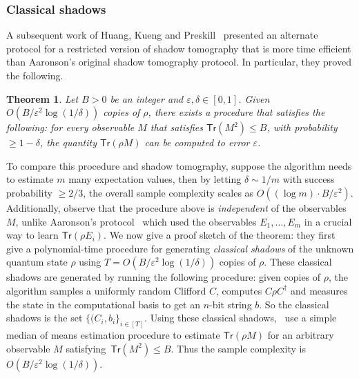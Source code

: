 \documentclass[11pt]{article}
\newcommand{\Tr}{\textsf{Tr}}
\newtheorem{theorem}{Theorem}
\begin{document}
\subsubsection{Classical shadows} 
A subsequent work of Huang, Kueng and Preskill~\cite{huangpreskill} presented an alternate protocol for a restricted version of shadow tomography that is more time efficient than Aaronson's original shadow tomography protocol. In particular, they proved the following.
\begin{theorem}
Let $B>0$ be an integer and $\varepsilon,\delta \in [0,1]$. Given $O(B/\varepsilon^2 \log(1/\delta))$ copies of $\rho$,  there exists a procedure that satisfies the following: for every observable $M$  that satisfies  $\Tr(M^2)\leq B$, with probability $\geq 1-\delta$, the quantity $\Tr(\rho M)$ can be computed to error $\varepsilon$.
\end{theorem}
To compare this procedure and shadow tomography, suppose the algorithm needs to estimate $m$ many expectation values, then by letting $\delta\sim 1/m$ with success probability $\geq 2/3$, the overall sample complexity scales as $O((\log m) \cdot B/\varepsilon^2)$. Additionally, observe that the procedure above is \emph{independent} of the observables $M$, unlike Aaronson's protocol~\cite{aaronson:shadow} which used the observables $E_1,\ldots, E_m$ in a crucial way to learn $\Tr(\rho E_i)$. We now give a proof sketch of the theorem: they first give a  polynomial-time procedure for generating \emph{classical shadows} of the unknown quantum state $\rho$ using $T=O(B/\varepsilon^2 \log(1/\delta))$ copies of $\rho$. These classical shadows are generated by running the following procedure: given copies of $\rho$, the algorithm samples a uniformly random Clifford $C$, computes $C\rho C^\dagger$ and measures the state in the computational basis to get an $n$-bit string $b$. So the classical shadows is the set $\{(C_i,b_i\}_{i\in [T]}$. Using these classical shadows,~\cite{huangpreskill} use a simple median of means estimation procedure to estimate $\Tr(\rho M)$ for an arbitrary observable $M$ satisfying~$\Tr(M^2)\leq B$. Thus the sample complexity is $O(B/\varepsilon^2\log(1/\delta))$.
\end{document}
